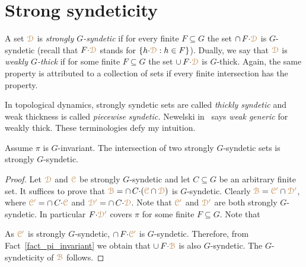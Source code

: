 \section{Strong syndeticity}\label{strong_syndeticity}

A set ${\color{brown}\EuScript D}$ is \emph{strongly $G$-syndetic\/} if for every finite $F\subseteq G$ the set $\cap\,F{\cdot}{\color{brown}\EuScript D}$ is $G$-syndetic (recall that $F{\cdot}{\color{brown}\EuScript D}$ stands for $\{h{\cdot}{\color{brown}\EuScript D} : h\in F\}$).
Dually, we say that ${\color{brown}\EuScript D}$ is \emph{weakly $G$-thick\/} if for some finite $F\subseteq G$ the set $\cup\,F{\cdot}{\color{brown}\EuScript D}$ is $G$-thick.
Again, the same property is attributed to a collection of sets if every finite intersection has the property.

\noindent\llap{\textcolor{red}{\Large\warning}\kern1.5ex}\ignorespaces
In topological dynamics, strongly syndetic sets are called \textit{thickly syndetic\/} and weak thickness is called \textit{piecewise syndetic.}
Newelski in~\cite{Newelski09} says \textit{weak generic\/} for weakly thick.
These terminologies defy my intuition.

\begin{lemma}\label{lem_strongly_syndetic}
  Assume $\pi$ is $G$-invariant.
  The intersection of two strongly $G$-syndetic sets is strongly $G$-syndetic.
\end{lemma}

\begin{proof}
  Let ${\color{brown}\EuScript D}$ and ${\color{brown}\EuScript C}$ be strongly $G$-syndetic and let $C\subseteq G$ be an arbitrary finite set.
  It suffices to prove that ${\color{brown}\EuScript B}=\cap\, C{\cdot}({\color{brown}\EuScript C}\cap{\color{brown}\EuScript D})$ is $G$-syndetic. 
  Clearly ${\color{brown}\EuScript B}={\color{brown}\EuScript C'}\cap{\color{brown}\EuScript D'}$, where ${\color{brown}\EuScript C'}=\cap\, C{\cdot}{\color{brown}\EuScript C}$ and ${\color{brown}\EuScript D'}=\cap\, C{\cdot}{\color{brown}\EuScript D}$.
  Note that ${\color{brown}\EuScript C'}$ and ${\color{brown}\EuScript D'}$ are both strongly $G$-syndetic.
  In particular $F{\cdot}\color{brown}\EuScript D'$ covers $\pi$ for some finite $F\subseteq G$.
  Note that
  
  
  
  As ${\color{brown}\EuScript C'}$ is strongly $G$-syndetic, $\cap\, F{\cdot}{\color{brown}\EuScript C'}$ is $G$-syndetic.
  Therefore, from Fact~\ref{fact_pi_invariant} we obtain that  $\cup\,F{\cdot}{\color{brown}\EuScript B}$ is also $G$-syndetic.
  The $G$-syndeticity of ${\color{brown}\EuScript B}$ follows.
\end{proof}

